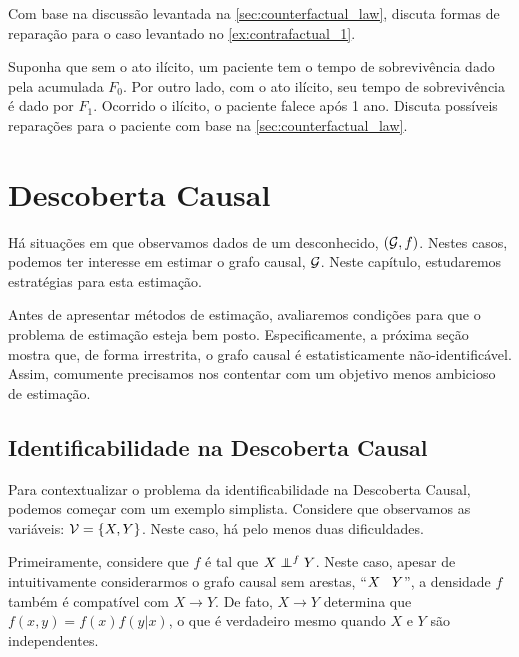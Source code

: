 \begin{exercise}
 Com base na discussão levantada na \cref{sec:counterfactual_law},
 discuta formas de reparação para
 o caso levantado no \cref{ex:contrafactual_1}.
\end{exercise}

\begin{exercise}
 Suponha que sem o ato ilícito,
 um paciente tem o tempo de sobrevivência dado
 pela acumulada $F_0$.
 Por outro lado, com o ato ilícito,
 seu tempo de sobrevivência é dado por $F_1$.
 Ocorrido o ilícito, o paciente falece após 1 ano.
 Discuta possíveis reparações para
 o paciente com base na \cref{sec:counterfactual_law}.
\end{exercise}

\chapter{Descoberta Causal}
\label{sec:discovery}

Há situações em que observamos dados de
um \CM desconhecido, $({\mathcal G}, f)$.
Nestes casos, podemos ter interesse em
estimar o grafo causal, ${\mathcal G}$.
Neste capítulo, estudaremos estratégias 
para esta estimação.

Antes de apresentar métodos de estimação,
avaliaremos condições para que 
o problema de estimação esteja bem posto.
Especificamente, a próxima seção mostra que,
de forma irrestrita, o grafo causal é 
estatisticamente não-identificável.
Assim, comumente precisamos nos contentar com
um objetivo menos ambicioso de estimação.

\section{Identificabilidade na Descoberta Causal}
\label{sec:discovery_id}

Para contextualizar o problema da
identificabilidade na Descoberta Causal,
podemos começar com um exemplo simplista.
Considere que observamos as variáveis: ${\mathcal V} = \{X, Y\}$.
Neste caso, há pelo menos duas dificuldades.

Primeiramente, considere que 
$f$ é tal que $X \perp\!\!\!\!\perp^f Y$.
Neste caso, apesar de intuitivamente 
considerarmos o grafo causal sem arestas,
``$X \hspace{3 mm} Y$'', 
a densidade $f$ também é compatível com
$X \rightarrow Y$.
De fato, $X \rightarrow Y$ determina que
$f(x, y) = f(x)f(y|x)$, 
o que é verdadeiro mesmo quando 
$X$ e $Y$ são independentes.

